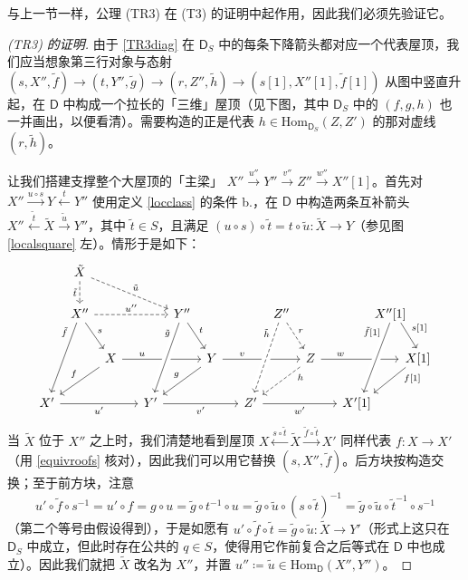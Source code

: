 与上一节一样，公理 (TR3) 在 (T3) 的证明中起作用，因此我们必须先验证它。

\begin{proof}[(\textup{TR3}) 的证明]
	由于 \eqref{TR3diag} 在 $\mathsf{D}_S$ 中的每条下降箭头都对应一个代表屋顶，我们应当想象第三行对象与态射 $(s,X'',\tilde{f})\rightarrow(t,Y'',\tilde{g})\rightarrow(r,Z'',\tilde{h})\rightarrow(s[1],X''[1],\tilde{f}[1])$ 从图中竖直升起，在 $\mathsf{D}$ 中构成一个拉长的「三维」屋顶（见下图，其中 $\mathsf{D}_S$ 中的 $(f,g,h)$ 也一并画出，以便看清）。需要构造的正是代表 $h\in\text{Hom}_{\mathsf{D}_S}(Z,Z')$ 的那对虚线 $(r,\tilde{h})$。
	
	让我们搭建支撑整个大屋顶的「主梁」 $X''\xrightarrow{u''}Y''\xrightarrow{v''}Z''\xrightarrow{w''}X''[1]$。首先对 $X''\xrightarrow{u\circ s} Y\xleftarrow{t} Y''$ 使用定义 \ref{locclass} 的条件 b.，在 $\mathsf{D}$ 中构造两条互补箭头 $X''\xleftarrow{\tilde{t}}\tilde{X}\xrightarrow{\tilde{u}}Y''$，其中 $\tilde{t}\in S$，且满足 $(u\circ s)\circ\tilde{t}=t\circ\tilde{u}:\tilde{X}\rightarrow Y$（参见图 \eqref{localsquare} 左）。情形于是如下：
	\[
	\begin{tikzcd}[column sep=0.15cm]
		& \tilde{X}\arrow[d, dashed, "\tilde{t}"']\arrow[drrrrr, dashed, "\tilde{u}"] & & & & & & & & & & & & & \\
		& X''\arrow[rrrrr, dashed, "u''"]\arrow[dr, "s"]\arrow[ddl, near start, "\tilde{f}"'] & & & & & Y''\arrow[dr, "t"] & & & & & Z''\arrow[dr, dashed, "r"] & & & & & \mkern-18mu X''[1]\arrow[dr, start anchor={[xshift=-2ex, yshift=-1.5ex]east}, end anchor={[xshift=-0ex, yshift=2ex]west}, "{s[1]}"] & \\
		& & X\arrow[rrrrr, near start, "u"]\arrow[dll, pos=0.5, "f"'] & & & & & Y\arrow[dll, pos=0.5, "g"']\arrow[rrrrr, near start, "v"] & & & & & Z\arrow[rrrrr, near start, end anchor={[xshift=-3.3ex]west}, "w"]\arrow[dll, dashed, pos=0.15, "h"] & & & & & \mkern-24mu X[1]\arrow[dll, pos=0.15, start anchor={[xshift=-2ex, yshift=-1.5ex]west}, end anchor={[xshift=-0.5ex, yshift=2ex]east}, "{f[1]}"]  \\
		X'\arrow[rrrrr, "u'"'] & & & & & Y'\arrow[from=uur, near start, crossing over, "\tilde{g}"']\arrow[rrrrr, "v'"'] & & & & & Z'\arrow[from=uur, near start, dashed, crossing over, "\tilde{h}"']\arrow[rrrrr, "w'"'] & & & & & X'[1]\arrow[from=uur, crossing over, near start, start anchor={[xshift=-4ex, yshift=-1.5ex]east}, "{\tilde{f}[1]}"']  & &
	\end{tikzcd}
	\]
	当 $\tilde{X}$ 位于 $X''$ 之上时，我们清楚地看到屋顶 $X\xleftarrow{s\circ\tilde{t}}\tilde{X}\xrightarrow{\tilde{f}\circ\tilde{t}} X'$ 同样代表 $f:X\rightarrow X'$（用 \eqref{equivroofs} 核对），因此我们可以用它替换 $(s,X'',\tilde{f})$。后方块按构造交换；至于前方块，注意
	\[
	u'\circ\tilde{f}\circ s^{-1}= u'\circ f=g\circ u=\tilde{g}\circ t^{-1}\circ u=\tilde{g}\circ\tilde{u}\circ (s\circ\tilde{t})^{-1}=\tilde{g}\circ\tilde{u}\circ\tilde{t}^{-1}\circ s^{-1}
	\]
	（第二个等号由假设得到），于是如愿有 $u'\circ\tilde{f}\circ\tilde{t}=\tilde{g}\circ\tilde{u}:\tilde{X}\rightarrow Y'$（形式上这只在 $\mathsf{D}_S$ 中成立，但此时存在公共的 $q\in S$，使得用它作前复合之后等式在 $\mathsf{D}$ 中也成立）。因此我们就把 $\tilde{X}$ 改名为 $X''$，并置 $u''\coloneqq\tilde{u}\in\text{Hom}_\mathsf{D}(X'',Y'')$。
	

\end{proof}
